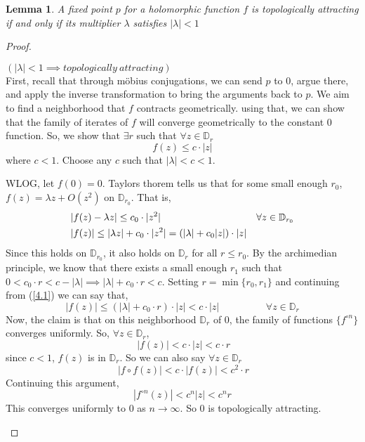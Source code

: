 \documentclass[reqno]{amsart}
\renewcommand{\eqref}[1]{(\ref{#1})}
\numberwithin{equation}{section}
\theoremstyle{plain}
\newtheorem{lemma}[theorem]{Lemma}
\theoremstyle{definition}
\theoremstyle{definition}
\begin{document}
    \begin{lemma}
        A fixed point $p$ for a holomorphic function $f$ is topologically attracting if and only if its multiplier $\lambda$ satisfies $|\lambda | < 1$
    \end{lemma}
    \begin{proof}
        \begin{samepage}
        $(|\lambda| < 1 \implies topologically \ attracting)$\\
        First, recall that through m\"obius conjugations, we can send $p$ to $0$, argue there, and apply the inverse transformation to bring the arguments back to $p$. We aim to find a neighborhood that $f$ contracts geometrically. using that, we can show that the family of iterates of $f$ will converge geometrically to the constant $0$ function. So, we show that $\exists r$ such that $\forall z \in \mathbb{D}_r$ 
        \[
            f(z) \leq c \cdot |z|
        \]
        where $c < 1$. Choose any $c$ such that $|\lambda| < c < 1$. 

        WLOG, let $f(0) = 0$. Taylors thorem tells us that for some small enough $r_0$, $ f(z) = \lambda z + O(z^2)$ on $\mathbb{D}_{r_0}$. That is,
        \begin{align}
        &|f(z) - \lambda z | \leq  c_0\cdot |z^2| & \forall z \in \mathbb{D}_{r_0} \notag\\
        &|f(z)| \leq |\lambda z| + c_0 \cdot |z^2| = (|\lambda| + c_0|z|)\cdot |z| \label{4.1}
        \end{align}
        Since this holds on $\mathbb{D}_{r_0}$, it also holds on $\mathbb{D}_{r}$ for all $r \leq r_0$. By the archimedian principle, we know that there exists a small enough $r_1$ such that $0 < c_0\cdot r < c - |\lambda| \implies |\lambda| + c_0\cdot r < c$. Setting $r = \min \{r_0, r_1\}$ and continuing from \eqref{4.1} we can say that, 
        \[
        |f(z)| \leq (|\lambda| + c_0\cdot r)\cdot |z| < c \cdot |z| \hspace{2cm} \forall z \in \mathbb{D}_r 
        \]
        Now, the claim is that on this neighborhood $\mathbb{D}_r$ of 0, the family of functions $\{f^{\circ n}\}$ converges uniformly. So, $\forall z \in \mathbb{D}_r$,
        \[
        \ |f(z)| < c \cdot |z| < c \cdot r
        \]
        since $c<1$, $f(z)$ is in $\mathbb{D}_r$. So we can also say $\forall z \in \mathbb{D}_r$
        \[
         \ |f \circ f(z)| < c \cdot |f(z)| < c^2 \cdot r 
        \]
        Continuing this argument,
        \[
         |f^{\circ n}(z)| < c^n |z| < c^n r
        \]
        This converges uniformly to $0$ as $n \to \infty$. So $0$ is topologically attracting.\\
        \end{samepage}


\end{proof}
\end{document}
